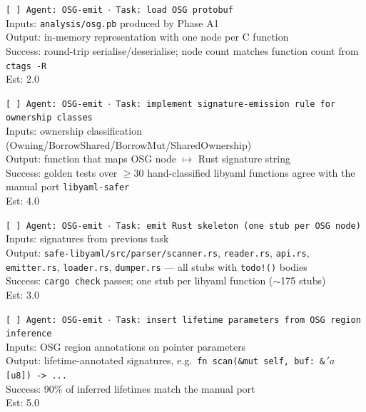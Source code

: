 \documentclass[12pt]{article}
\theoremstyle{definition}
\theoremstyle{remark}
\newcommand{\lifetime}[1]{\ensuremath{\,'\!#1}}
\begin{document}
\begin{small}
\noindent\texttt{[ ] Agent: OSG-emit $\cdot$ Task: load OSG protobuf}\\
\hspace*{2em}Inputs: \texttt{analysis/osg.pb} produced by Phase A1\\
\hspace*{2em}Output: in-memory representation with one node per C function\\
\hspace*{2em}Success: round-trip serialise/deserialise; node count matches function count from \texttt{ctags -R}\\
\hspace*{2em}Est: 2.0

\noindent\texttt{[ ] Agent: OSG-emit $\cdot$ Task: implement signature-emission rule for ownership classes}\\
\hspace*{2em}Inputs: ownership classification (Owning/BorrowShared/BorrowMut/SharedOwnership)\\
\hspace*{2em}Output: function that maps OSG node $\mapsto$ Rust signature string\\
\hspace*{2em}Success: golden tests over $\geq 30$ hand-classified libyaml functions agree with the manual port \texttt{libyaml-safer}\\
\hspace*{2em}Est: 4.0

\noindent\texttt{[ ] Agent: OSG-emit $\cdot$ Task: emit Rust skeleton (one stub per OSG node)}\\
\hspace*{2em}Inputs: signatures from previous task\\
\hspace*{2em}Output: \texttt{safe-libyaml/src/parser/scanner.rs}, \texttt{reader.rs}, \texttt{api.rs}, \texttt{emitter.rs}, \texttt{loader.rs}, \texttt{dumper.rs} --- all stubs with \texttt{todo!()} bodies\\
\hspace*{2em}Success: \texttt{cargo check} passes; one stub per libyaml function ($\sim$175 stubs)\\
\hspace*{2em}Est: 3.0

\noindent\texttt{[ ] Agent: OSG-emit $\cdot$ Task: insert lifetime parameters from OSG region inference}\\
\hspace*{2em}Inputs: OSG region annotations on pointer parameters\\
\hspace*{2em}Output: lifetime-annotated signatures, e.g.\ \texttt{fn scan(\&mut self, buf: \&\lifetime{a} [u8]) -> ...}\\
\hspace*{2em}Success: 90\% of inferred lifetimes match the manual port\\
\hspace*{2em}Est: 5.0


\end{small}
\end{document}
